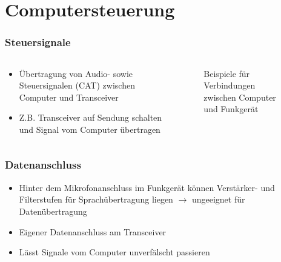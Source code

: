 
\section{Computersteuerung}
\label{section:computersteuerung}
\begin{frame}%

\frametitle{Steuersignale}
\begin{columns}
    \begin{column}{0.48\textwidth}
    \begin{itemize}
  \item Übertragung von Audio- sowie Steuersignalen (CAT) zwischen Computer und Transceiver
  \item Z.B. Transceiver auf Sendung schalten und Signal vom Computer übertragen
  \end{itemize}

    \end{column}
   \begin{column}{0.48\textwidth}
       
\begin{figure}
    \caption{\scriptsize Beispiele für Verbindungen zwischen Computer und Funkgerät}
    \label{n_computersteuerung_verbindungen}
\end{figure}


   \end{column}
\end{columns}

\end{frame}

\begin{frame}
\frametitle{Datenanschluss}
\begin{itemize}
  \item Hinter dem Mikrofonanschluss im Funkgerät können Verstärker- und Filterstufen für Sprachübertragung liegen $\rightarrow$ ungeeignet für Datenübertragung
  \item Eigener Datenanschluss am Transceiver
  \item Lässt Signale vom Computer unverfälscht passieren
  \end{itemize}

\end{frame}

